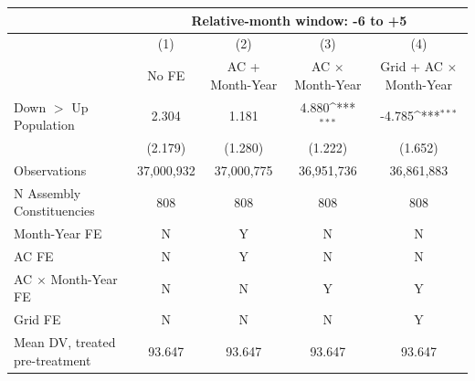 {
\def\sym#1{\ifmmode^{#1}\else\(^{#1}\)\fi}
\begin{tabular}{l*{4}{c}}
\hline
&\multicolumn{4}{c}{Relative-month window: -6 to +5} \\ \hline
            &\multicolumn{1}{c}{(1)}&\multicolumn{1}{c}{(2)}&\multicolumn{1}{c}{(3)}&\multicolumn{1}{c}{(4)}\\
            &\multicolumn{1}{c}{No FE}&\multicolumn{1}{c}{AC + Month-Year}&\multicolumn{1}{c}{AC $\times$ Month-Year}&\multicolumn{1}{c}{Grid + AC $\times$ Month-Year}\\
\hline
Down $>$ Up Population&       2.304         &       1.181         &       4.880\sym{***}&      -4.785\sym{***}\\
            &     (2.179)         &     (1.280)         &     (1.222)         &     (1.652)         \\
\hline
Observations&  37,000,932         &  37,000,775         &  36,951,736         &  36,861,883         \\
N Assembly Constituencies&         808         &         808         &         808         &         808         \\
Month-Year FE&           N         &           Y         &           N         &           N         \\
AC FE       &           N         &           Y         &           N         &           N         \\
AC $\times$ Month-Year FE&           N         &           N         &           Y         &           Y         \\
Grid FE     &           N         &           N         &           N         &           Y         \\
Mean DV, treated pre-treatment&      93.647         &      93.647         &      93.647         &      93.647         \\
\hline
\end{tabular}
}
